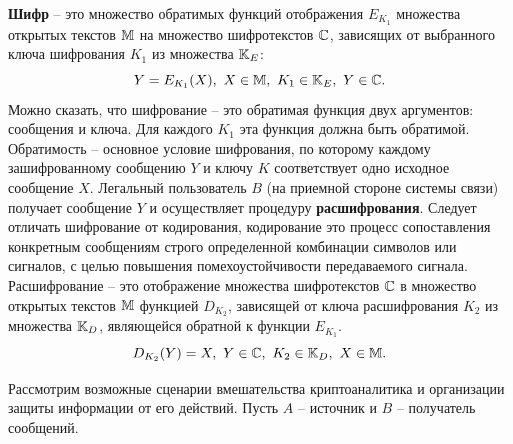 \textbf{Шифр} -- это множество обратимых функций отображения $E_{K_1}$ множества открытых текстов $\mathbb{M}$ на множество шифротекстов $\mathbb{C}$, зависящих от выбранного ключа шифрования $K_1$ из множества $\mathbb{K}_E$:
\begin{equation}
    \label{eq:Encryption}
    Y = E_{K_1}(X), ~ X \in \mathbb{M}, ~ K_1 \in \mathbb{K}_E, ~ Y \in \mathbb{C}.
\end{equation}
Можно сказать, что шифрование -- это обратимая функция двух аргументов: сообщения и ключа. Для каждого $K_1$ эта функция должна быть обратимой. Обратимость -- основное условие шифрования, по которому каждому зашифрованному сообщению $Y$ и ключу $K$ соответствует одно исходное сообщение $X$. Легальный пользователь $B$ (на приемной стороне системы связи)  получает сообщение $Y$ и осуществляет процедуру \textbf{расшифрования}.
Следует отличать шифрование от кодирования, кодирование это процесс сопоставления конкретным сообщениям строго определенной комбинации символов или сигналов, с целью повышения помехоустойчивости передаваемого сигнала.
Расшифрование --  это отображение множества шифротекстов $\mathbb{C}$ в множество открытых текстов $\mathbb{M}$ функцией $D_{K_2}$, зависящей от ключа расшифрования $K_2$ из множества $\mathbb{K}_D$, являющейся обратной к функции $E_{K_1}$.
\begin{equation}
    \label{eq:Decryption}
    D_{K_2}(Y) = X, ~ Y \in \mathbb{C}, ~ K_2 \in \mathbb{K}_D, ~ X \in \mathbb{M}.
\end{equation}



Рассмотрим возможные сценарии вмешательства криптоаналитика и организации защиты информации от его действий.
Пусть  $A$ --  источник и $B$ -- получатель сообщений.

